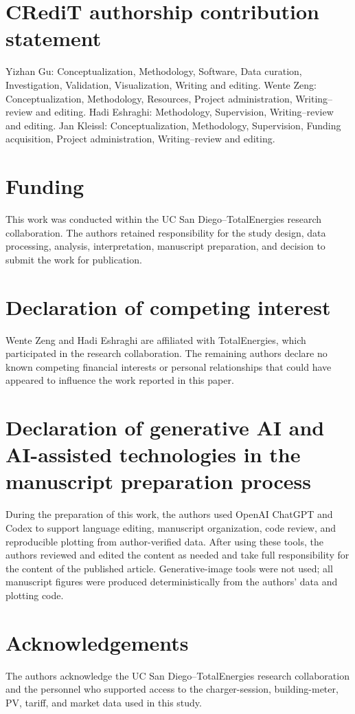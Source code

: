 \documentclass[final,5p,times]{elsarticle}
\begin{document}
\section*{CRediT authorship contribution statement}
Yizhan Gu: Conceptualization, Methodology, Software, Data curation, Investigation, Validation, Visualization, Writing and editing. Wente Zeng: Conceptualization, Methodology, Resources, Project administration, Writing--review and editing. Hadi Eshraghi: Methodology, Supervision, Writing--review and editing. Jan Kleissl: Conceptualization,
Methodology, Supervision, Funding acquisition, Project administration, Writing--review and editing.

\section*{Funding}
This work was conducted within the UC San Diego--TotalEnergies research
collaboration. The authors retained responsibility for the study design, data
processing, analysis, interpretation, manuscript preparation, and decision to
submit the work for publication.

\section*{Declaration of competing interest}
Wente Zeng and Hadi Eshraghi are affiliated with TotalEnergies, which
participated in the research collaboration. The remaining authors declare no
known competing financial interests or personal relationships that could have
appeared to influence the work reported in this paper.

\section*{Declaration of generative AI and AI-assisted technologies in the manuscript preparation process}
During the preparation of this work, the authors used OpenAI ChatGPT and Codex
to support language editing, manuscript organization, code review, and
reproducible plotting from author-verified data. After using these tools, the
authors reviewed and edited the content as needed and take full responsibility
for the content of the published article. Generative-image tools were not used;
all manuscript figures were produced deterministically from the authors' data
and plotting code.

\section*{Acknowledgements}
The authors acknowledge the UC San Diego--TotalEnergies research collaboration
and the personnel who supported access to the charger-session, building-meter,
PV, tariff, and market data used in this study.

\clearpage


\end{document}
